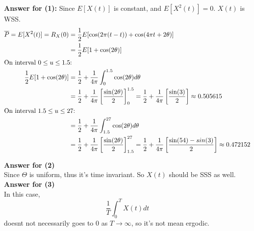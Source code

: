   \textbf{Answer for (1):}
  Since $E[X(t)]$ is constant, and $E[X^2(t)] = 0$. $X(t)$ is WSS.
  \begin{align*}
    \overline{P} = E[X^2(t)] = R_X(0)
    & = \frac{1}{2}E[\cos (2 \pi (t - t)) + \cos (4\pi t + 2\theta)]\\
    & = \frac{1}{2}E[1 + \cos (2\theta)] \\
    \shortintertext{On interval $0\leq u \leq 1.5$:}
    \frac{1}{2}E[1 + \cos (2\theta)]
    & = \dfrac{1}{2} + \dfrac{1}{4\pi}\int_0^{1.5}\cos (2\theta) d\theta \\
    & = \dfrac{1}{2} + \dfrac{1}{4\pi}\left[ \dfrac{\sin(2\theta)}{2} \right]_0^{1.5}
      = \dfrac{1}{2} + \dfrac{1}{4\pi}\left[ \dfrac{\sin(3)}{2} \right]
      \approx 0.505615 \\
    \shortintertext{On interval $1.5\leq u \leq 27$:}
    & = \dfrac{1}{2} + \dfrac{1}{4\pi}\int_{1.5}^{27}\cos (2\theta) d\theta \\
    & = \dfrac{1}{2} + \dfrac{1}{4\pi}\left[ \dfrac{\sin(2\theta)}{2} \right]_{1.5}^{27}
      = \dfrac{1}{2} + \dfrac{1}{4\pi}\left[ \dfrac{\sin(54)- sin(3)}{2} \right]
      \approx 0.472152
  \end{align*}

  \textbf{Answer for (2)}\\
  Since $\Theta$ is uniform, thus it's time invariant. So $X(t)$ should be SSS as well. \\


  \textbf{Answer for (3)}\\
  In this case, $$\frac{1}{T} \int_0^T X(t) dt$$ doesnt not necessarily
  goes to 0 as $T \rightarrow \infty$, so it's not mean ergodic.\\